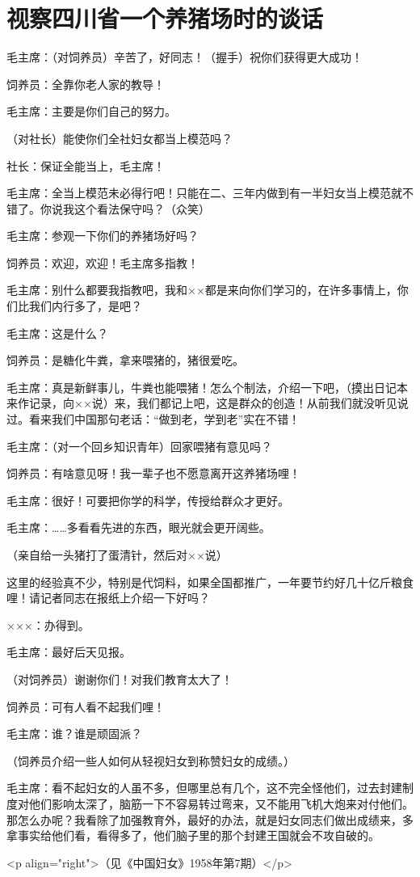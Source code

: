 \section[视察四川省一个养猪场时的谈话（一九五八年三月）]{视察四川省一个养猪场时的谈话}


毛主席：（对饲养员）辛苦了，好同志！（握手）祝你们获得更大成功！

饲养员：全靠你老人家的教导！

毛主席：主要是你们自己的努力。

（对社长）能使你们全社妇女都当上模范吗？

社长：保证全能当上，毛主席！

毛主席：全当上模范未必得行吧！只能在二、三年内做到有一半妇女当上模范就不错了。你说我这个看法保守吗？（众笑）

毛主席：参观一下你们的养猪场好吗？

饲养员：欢迎，欢迎！毛主席多指教！

毛主席：别什么都要我指教吧，我和××都是来向你们学习的，在许多事情上，你们比我们内行多了，是吧？

毛主席：这是什么？

饲养员：是糖化牛粪，拿来喂猪的，猪很爱吃。

毛主席：真是新鲜事儿，牛粪也能喂猪！怎么个制法，介绍一下吧，（摸出日记本来作记录，向××说）来，我们都记上吧，这是群众的创造！从前我们就没听见说过。看来我们中国那句老话：“做到老，学到老”实在不错！

毛主席：（对一个回乡知识青年）回家喂猪有意见吗？

饲养员：有啥意见呀！我一辈子也不愿意离开这养猪场哩！

毛主席：很好！可要把你学的科学，传授给群众才更好。

毛主席：……多看看先进的东西，眼光就会更开阔些。

（亲自给一头猪打了蛋清针，然后对××说）

这里的经验真不少，特别是代饲料，如果全国都推广，一年要节约好几十亿斤粮食哩！请记者同志在报纸上介绍一下好吗？

×××：办得到。

毛主席：最好后天见报。

（对饲养员）谢谢你们！对我们教育太大了！

饲养员：可有人看不起我们哩！

毛主席：谁？谁是顽固派？

（饲养员介绍一些人如何从轻视妇女到称赞妇女的成绩。）

毛主席：看不起妇女的人虽不多，但哪里总有几个，这不完全怪他们，过去封建制度对他们影响太深了，脑筋一下不容易转过弯来，又不能用飞机大炮来对付他们。那怎么办呢？我看除了加强教育外，最好的办法，就是妇女同志们做出成绩来，多拿事实给他们看，看得多了，他们脑子里的那个封建王国就会不攻自破的。

<p align="right">（见《中国妇女》1958年第7期）</p>

